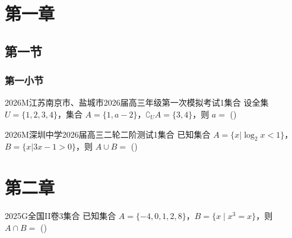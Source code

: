 \documentclass[12pt,UTF-8,a4paper,openany]{ctexbook}
\numberwithin{figure}{section}
\theoremstyle{mystyle}
\theoremstyle{mystylekaishu}
\theoremstyle{mystyle}
\numberwithin{xiti}{section}
\begin{document}
%  
% 
% 
% 

\chapter{第一章}

\section{第一节}

\subsection{第一小节}

\begin{lanbox}
\begin{problem}{2026}{M}{江苏南京市、盐城市2026届高三年级第一次模拟考试}{1}{集合}
设全集 $U=\{1,2,3,4\}$，集合 $A=\{1,a-2\}$，$\complement_U A=\{3,4\}$，则 $a=$
(\hspace{1cm})
\begin{choices}
\end{choices}
\end{problem}
\end{lanbox}

\begin{lanbox}
\begin{problem}{2026}{M}{深圳中学2026届高三二轮二阶测试}{1}{集合}
已知集合 $A=\{x|\log_2 x<1\}$，$B=\{x|3x-1>0\}$，则 $A\cup B=$ (\hspace{1cm})
\begin{choices}
\choice{{$\left(\dfrac{1}{3},2\right]$}}
\end{choices}
\end{problem}
\end{lanbox}

\chapter{第二章}

\begin{lanbox}
\begin{problem}{2025}{G}{全国II卷}{3}{集合}
已知集合 $A=\{-4,0,1,2,8\}$，$B=\{x \mid x^3=x\}$，则 $A \cap B =$
(\hspace{1cm})
\begin{choices}
\end{choices}
\end{problem}
\end{lanbox}
\end{document}
